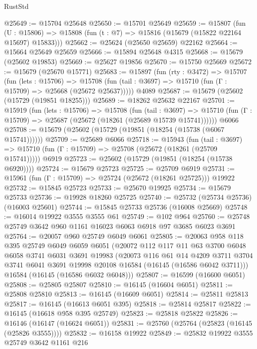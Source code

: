 \begin{lexlean}{RustStd}
\begin{coremodule}
@25649 := @15704 @25648
@25650 := @15701 @25649
@25659 := @15807
    (fun (U : @15806) => @15808 (fun (t : @7) => @15816 (@15679 (@15822 @22164 @15697) @15833)))
@25662 := @25624 (@25650 @25659) @22162
@25664 := @15664 @25649 @25659
@25666 := @15894 @25648 @4315
@25668 := @15679 (@25602 @19853)
@25669 := @25627 @19856
@25670 := @15750 @25669
@25672 := @15679 (@25670 @15771)
@25683 := @15897
    (fun (rty : @3472) =>
    @15707
      (fun (lets : @15706) =>
      @15708 (fun (tail : @3697) => @15710 (fun (Γ : @15709) => @25668 (@25672 @25637)))))
    @4089
@25687 := @15679 (@25602 (@15729 (@19851 @18255)))
@25689 := @18262 @25632 @22167
@25701 := @15919
    (fun (lets : @15706) =>
    @15708
      (fun (tail : @3697) =>
      @15710 (fun (Γ : @15709) => @25687 (@25672 (@18261 (@25689 @15739 @15741))))))
    @6066
@25708 := @15679 (@25602 (@15729 (@19851 (@18254 (@15738 (@6067 @15741))))))
@25709 := @25689 @6066
@25718 := @15943
    (fun (tail : @3697) => @15710 (fun (Γ : @15709) => @25708 (@25672 (@18261 (@25709 @15741)))))
    @6919
@25723 := @25602 (@15729 (@19851 (@18254 (@15738 @6920))))
@25724 := @15679 @25723
@25725 := @25709 @6919
@25731 := @15961 (fun (Γ : @15709) => @25724 (@25672 (@18261 @25725))) @19922
@25732 := @15845 @25723
@25733 := @25670 @19925
@25734 := @15679 @25733
@25736 := @19928 @18260 @25725
@25740 := @25732 (@25734 @25736) (@16003 @25601)
@25744 := @15845 @25733 @25736 (@16008 @25669)
@25748 := @16014 @19922 @3555 @3555 @61
@25749 := @102 @964
@25760 := @25748 @25749 @3642 @960 @1161 @16023 @6063 @6918 @97 @3685 @6023 @3691
@25764 := @20057 @960 @25749 @6049 @6061
@25805 := @20063
    @958
    @118
    @395
    @25749
    @6049
    @6059
    @6051
    (@20072
      @112
      @117
      @11
      @63
      @3700
      @6048
      @6058
      @3741
      @6031
      @3691
      @19983
      (@20073
        @116
        @61
        @14
        @4209
        @3711
        @3704
        @3741
        @6041
        @3691
        @19998
        @20108
        @16584
        (@16145 (@16586 @6042 @3711)))
      @16584
      (@16145 (@16586 @6032 @6048)))
@25807 := @16599 (@16600 @6051)
@25808 := @25805 @25807
@25810 := @16145 (@16604 @6051)
@25811 := @25808 @25810
@25813 := @16145 (@16609 @6051)
@25814 := @25811 @25813
@25817 := @16145 (@16613 @6051 @395)
@25818 := @25814 @25817
@25822 := @16145 (@16618 @958 @395 @25749)
@25823 := @25818 @25822
@25826 := @16146 (@16147 (@16624 @6051))
@25831 := @25760 (@25764 (@25823 (@16145 (@25826 @3555))))
@25832 := @16158 @19922
@25849 := @25832
    @19922
    @3555
    @25749
    @3642
    @1161
    @216

\end{coremodule}
\end{lexlean}
